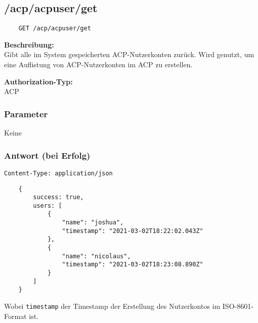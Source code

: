 \subsection{/acp/acpuser/get}

\begin{lstlisting}
    GET /acp/acpuser/get
\end{lstlisting}

\textbf{Beschreibung:} \\
Gibt alle im System gespeicherten ACP-Nutzerkonten zurück. Wird genutzt, um eine Auflistung von ACP-Nutzerkonten im ACP zu erstellen.

\textbf{Authorization-Typ:} \\
ACP

\subsubsection{Parameter}
Keine

\subsubsection{Antwort (bei Erfolg)}

\lstinline{Content-Type: application/json}
\begin{lstlisting}
    {
        success: true, 
        users: [
            {
                "name": "joshua",
                "timestamp": "2021-03-02T18:22:02.043Z"
            },
            {
                "name": "nicolaus",
                "timestamp": "2021-03-02T18:23:08.890Z"
            }
        ]
    }
\end{lstlisting}

Wobei \lstinline{timestamp} der Timestamp der Erstellung des Nutzerkontos im ISO-8601-Format ist.
